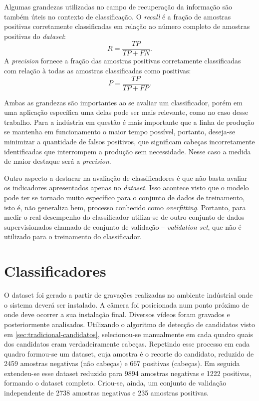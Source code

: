 Algumas grandezas utilizadas no campo de recuperação da informação \cite{inforetrival} são também úteis no contexto de classificação. O \textit{recall} é a fração de amostras positivas corretamente classificadas em relação ao número completo de amostras positivas do \textit{dataset}:
\begin{equation}
R = \frac{TP}{TP+FN}.
\end{equation}
A \textit{precision} fornece a fração das amostras positivas corretamente classificadas com relação à todas as amostras classificadas como positivas:
\begin{equation}
P = \frac{TP}{TP+FP}.
\end{equation}

Ambas as grandezas são importantes ao se avaliar um classificador, porém em uma aplicação específica uma delas pode ser mais relevante, como no caso desse trabalho. Para a indústria em questão é mais importante que a linha de produção se mantenha em funcionamento o maior tempo possível, portanto, deseja-se minimizar a quantidade de falsos positivos, que significam cabeças incorretamente identificadas que interrompem a produção sem necessidade. Nesse caso a medida de maior destaque será a \textit{precision}.

Outro aspecto a destacar na avaliação de classificadores é que não basta avaliar os indicadores apresentados apenas no \textit{dataset}. Isso acontece visto que o modelo pode ter se tornado muito específico para o conjunto de dados de treinamento, isto é, não generaliza bem, processo conhecido como \textit{overfitting}. Portanto, para medir o real desempenho do classificador utiliza-se de outro conjunto de dados supervisionados chamado de conjunto de validação -- \textit{validation set}, que não é utilizado para o treinamento do classificador.


\section{Classificadores}
\label{sec:resultados-classificadores}
O dataset foi gerado a partir de gravações realizadas no ambiente indústrial onde o sistema deverá ser instalado. A câmera foi posicionada num ponto próximo de onde deve ocorrer a sua instalação final. Diversos vídeos foram gravados e posteriormente analisados. Utilizando o algoritmo de detecção de candidatos visto em \ref{sec:tradicional-candidatos}, selecionou-se manualmente em cada quadro quais dos candidatos eram verdadeiramente cabeças. Repetindo esse processo em cada quadro formou-se um dataset, cuja amostra é o recorte do candidato, reduzido de 2459 amostras negativas (não cabeças) e 667 positivas (cabeças). Em seguida extendeu-se esse dataset reduzido para 9894 amostras negativas e 1222 positivas, formando o dataset completo. Criou-se, ainda, um conjunto de validação independente de 2738 amostras negativas e 235 amostras positivas.

